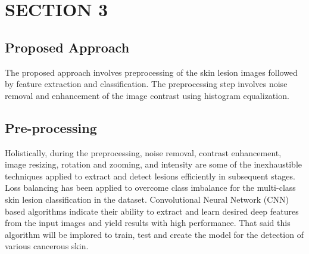 \documentclass[twocolumn]{article}
\begin{document}
\section{SECTION 3}

\subsection{Proposed Approach}
The proposed approach involves preprocessing of the skin lesion images followed by feature extraction and classification. The preprocessing step involves noise removal and enhancement of the image contrast using histogram equalization.

\subsection{Pre-processing}
Holistically, during the preprocessing, noise removal, contrast enhancement, image resizing, rotation and zooming, and intensity are some of the inexhaustible techniques applied to extract and detect lesions efficiently in subsequent stages.  Loss balancing has been applied to overcome class imbalance for the multi-class skin lesion classification in the dataset. Convolutional Neural Network (CNN) based algorithms indicate their ability to extract and learn desired deep features from the input images and yield results with high performance. That said this algorithm will be implored to train, test and create the model for the detection of various cancerous skin.
\end{document}
